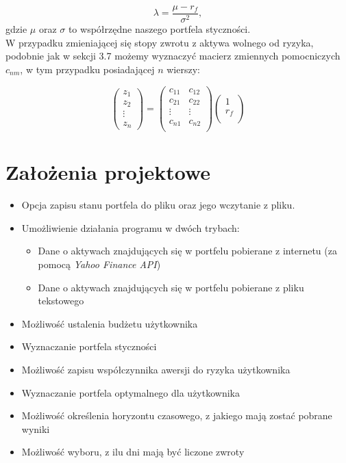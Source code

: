 \documentclass[magister]{dyplom}
\begin{document}
\begin{equation}
	\lambda = \frac{\mu - r_f}{{\sigma}^2},
\end{equation}
gdzie $\mu$ oraz $\sigma$ to współrzędne naszego portfela styczności.\\

W przypadku zmieniającej się stopy zwrotu z aktywa wolnego od ryzyka, podobnie jak w sekcji 3.7 możemy wyznaczyć macierz zmiennych pomocniczych $c_{nm}$, w tym przypadku posiadającej $n$ wierszy:

\begin{equation}
	\left( \begin{array}{c}
		z_1\\
		z_2\\
		\vdots\\
		z_n
	\end{array} \right) = 
	\left( \begin{array}{cc}
		c_{11}& c_{12}\\
		c_{21}& c_{22}\\
		\vdots& \vdots\\
		c_{n1}& c_{n2}\\
	\end{array} \right)
	\left( \begin{array}{c}
		1\\
		r_f\\
	\end{array} \right)
\end{equation}

\chapter{Założenia projektowe}

\begin{itemize}
	\item Opcja zapisu stanu portfela do pliku oraz jego wczytanie z pliku.
	\item Umożliwienie działania programu w dwóch trybach:
	\begin{itemize}
		\item Dane o aktywach znajdujących się w portfelu pobierane z internetu (za pomocą \textit{Yahoo Finance API})
		\item Dane o aktywach znajdujących się w portfelu pobierane z pliku tekstowego
	\end{itemize}
	\item Możliwość ustalenia budżetu użytkownika
	\item Wyznaczanie portfela styczności
	\item Możliwość zapisu współczynnika awersji do ryzyka użytkownika
	\item Wyznaczanie portfela optymalnego dla użytkownika
	\item Możliwość określenia horyzontu czasowego, z jakiego mają zostać pobrane wyniki
	\item Możliwość wyboru, z ilu dni mają być liczone zwroty
\end{itemize}
\end{document}
